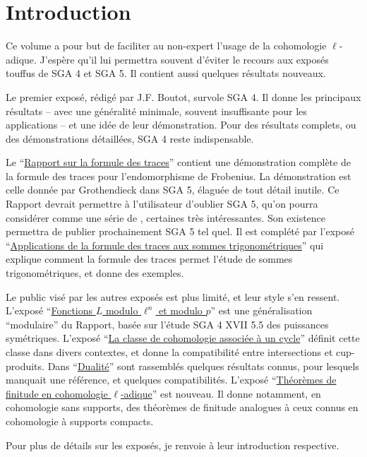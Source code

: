 

\chapter*{Introduction}

Ce volume a pour but de faciliter au non-expert l'usage de la 
cohomologie $\ell$-adique. J'espère qu'il lui permettra souvent d'éviter le 
recours aux exposés touffus de SGA 4 et SGA 5. Il contient aussi quelques 
résultats nouveaux. 

Le premier exposé, rédigé par J.F. Boutot, survole SGA 4. Il donne les 
principaux résultats -- avec une généralité minimale, souvent 
insuffisante pour les applications -- et une idée de leur démonstration. Pour 
des résultats complets, ou des démonstrations détaillées, SGA 4 reste 
indispensable. 

Le ``\hyperref[II]{Rapport sur la formule des traces}'' contient une démonstration complète de 
la formule des traces pour l'endomorphisme de Frobenius. La démonstration est 
celle donnée par Grothendieck dans SGA 5, élaguée de tout détail inutile. Ce 
Rapport devrait permettre à l'utilisateur d'oublier SGA 5, qu'on pourra 
considérer comme une série de , certaines très intéressantes. Son 
existence permettra de publier prochainement SGA 5 tel quel. Il est complété 
par l'exposé ``\hyperref[VI]{Applications de la formule des traces aux sommes trigonométriques}'' qui explique comment la formule des traces permet 
l'étude de sommes trigonométriques, et donne des exemples. 

Le public visé par les autres exposés est plus limité, et leur style s'en 
ressent. L'exposé ``\hyperref[III]{Fonctions $L$ modulo $\ell^n$ et modulo $p$}'' est une 
généralisation ``modulaire'' du Rapport, basée sur l'étude SGA 4 XVII 5.5 des 
puissances symétriques. L'exposé ``\hyperref[IV]{La classe de cohomologie associée à un cycle}'' 
définit cette classe dans divers contextes, et donne la compatibilité 
entre intersections et cup-produits. Dans ``\hyperref[V]{Dualité}'' sont rassemblés 
quelques résultats connus, pour lesquels manquait une référence, et quelques 
compatibilités. L'exposé ``\hyperref[VII]{Théorèmes de finitude en cohomologie $\ell$-adique}'' 
est nouveau. Il donne notamment, en cohomologie sans supports, des théorèmes de 
finitude analogues à ceux connus en cohomologie à supports compacts. 

Pour plus de détails sur les exposés, je renvoie à leur introduction 
respective. 


